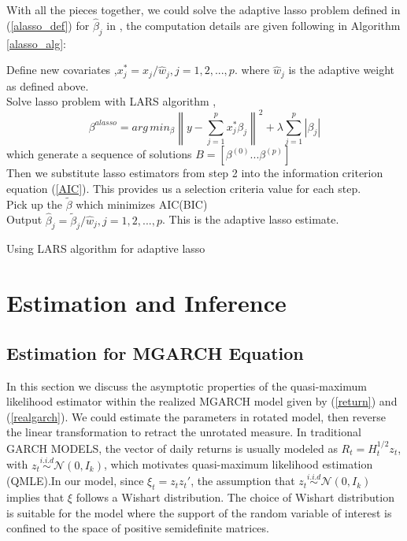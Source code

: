 \documentclass[titlepage,11pt]{article}
\begin{document}
With all the pieces together, we could solve the adaptive lasso problem defined in (\ref{alasso_def}) for $\hat{\beta}_j$ in , the computation details are given following in Algorithm \ref{alasso_alg}:


\begin{algorithm}[!htbp]
	Define new covariates ,$x_j^* = x_j/\hat{w}_j, j = 1,2,...,p $. where $\hat{w}_j$ is the adaptive weight as defined above.\\
	Solve lasso problem with LARS algorithm  ,
	\begin{equation*}
		\beta^{alasso}=arg\,min_{\beta} \left\| y-\sum^p_{j=1}x_j^*\beta_j \right\| ^2 + \lambda\sum^p_{j=1}|\beta_j|
	\end{equation*}
	which generate a sequence of solutions $B = [\beta^{(0)}...\beta^{(p)}]$\\
	Then we substitute lasso estimators from step 2  into the information criterion equation (\ref{AIC}). This provides us a selection criteria value for each step.\\
	Pick up the  $\tilde{\beta}$  which minimizes AIC(BIC) \\
	Output $\hat{\beta}_j = \tilde{\beta}_j/\hat{w}_j, j = 1,2,...,p $. This is the adaptive lasso estimate.
	\caption{Using LARS algorithm for adaptive lasso}
	\label{alasso_alg}
\end{algorithm}





\section{Estimation and Inference}
\subsection{Estimation for MGARCH Equation}
In this section we discuss the asymptotic properties of the quasi-maximum likelihood estimator within the realized MGARCH model given by (\ref{return}) and (\ref{realgarch}). We could estimate the parameters in rotated model, then reverse the linear transformation to retract the unrotated measure.
In traditional GARCH MODELS, the vector of daily returns is usually modeled as $R_t=H_t^{1/2} z_t$, with $z_t \overset{i.i.d} {\sim} \mathcal{N}(0,I_k)$, which motivates quasi-maximum likelihood estimation (QMLE).In our model, since $\xi_t = z_t z_t'$, the assumption that $z_t \overset{i.i.d} {\sim} \mathcal{N}(0,I_k)$ implies that $\xi$ follows a Wishart distribution. The choice of Wishart distribution is suitable for the model where the support of the random variable of interest is confined to the space of positive semidefinite matrices. 
\end{document}
